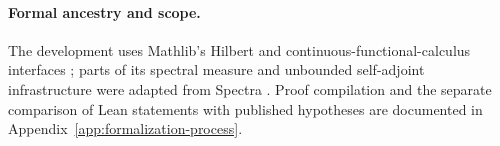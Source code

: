 \paragraph{Formal ancestry and scope.}
The development uses Mathlib's Hilbert and continuous-functional-calculus
interfaces \citep{mathlib2020,dedecker2025cfc}; parts of its spectral
measure and unbounded self-adjoint infrastructure were adapted from
Spectra \citep{bornemann2026spectra}.  Proof compilation and the
separate comparison of Lean statements with published hypotheses are
documented in Appendix~\ref{app:formalization-process}.
